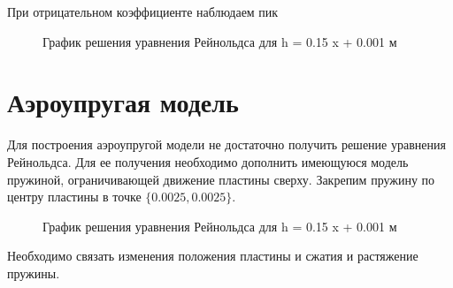 \documentclass[a4paper,14pt]{extarticle}
\begin{document}
При отрицательном коэффициенте наблюдаем пик
\begin{figure}[!htbp]
	\caption{График решения уравнения Рейнольдса для h = 0.15 x + 0.001 м}
	\label{sol_pos_h}
\end{figure}

\newpage
\section{Аэроупругая модель}
Для построения аэроупругой модели не достаточно получить решение уравнения Рейнольдса. Для ее получения необходимо дополнить имеющуюся модель пружиной, ограничивающей движение пластины сверху. Закрепим пружину по центру пластины в точке $\{0.0025, 0.0025\}$. 

\begin{figure}[!htbp]
	\caption{График решения уравнения Рейнольдса для h = 0.15 x + 0.001 м}
	\label{pruzina}
\end{figure}


Необходимо связать изменения положения пластины и сжатия и растяжение пружины.
\end{document}
